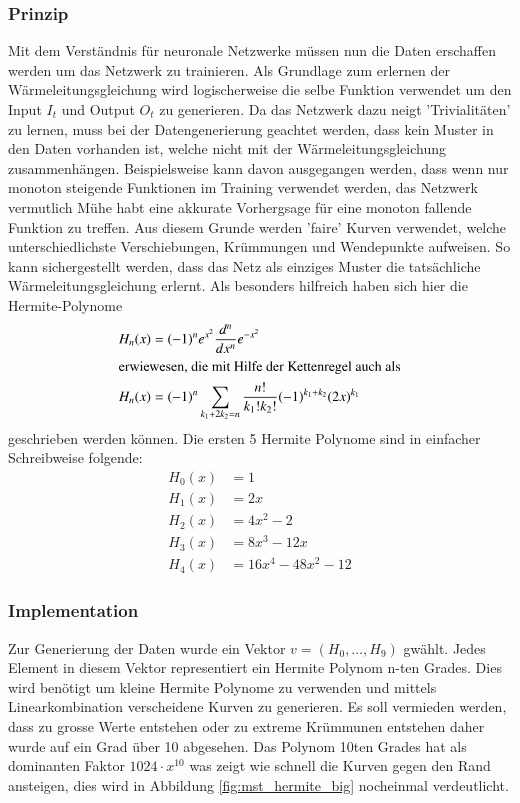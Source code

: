 \subsubsection{Prinzip}
Mit dem Verständnis für neuronale Netzwerke müssen nun die Daten erschaffen werden um das Netzwerk zu trainieren. Als Grundlage zum erlernen der Wärmeleitungsgleichung wird logischerweise die selbe Funktion verwendet um den Input $I_{t}$ und Output $O_{t}$ zu generieren. Da das Netzwerk dazu neigt 'Trivialitäten' zu lernen, muss bei der Datengenerierung geachtet werden, dass kein Muster in den Daten vorhanden ist, welche nicht mit der Wärmeleitungsgleichung zusammenhängen. Beispielsweise kann davon ausgegangen werden, dass wenn nur monoton steigende Funktionen im Training verwendet werden, das Netzwerk vermutlich Mühe habt eine akkurate Vorhergsage für eine monoton fallende Funktion zu treffen. Aus diesem Grunde werden 'faire' Kurven verwendet, welche unterschiedlichste Verschiebungen, Krümmungen und Wendepunkte aufweisen. So kann sichergestellt werden, dass das Netz als einziges Muster die tatsächliche Wärmeleitungsgleichung erlernt. Als besonders hilfreich haben sich hier die Hermite-Polynome
\begin{align}
	H_n(x) &=(-1)^{n}e^{x^{2}}{\frac {d^{n}}{d x^{n}}}e^{-x^{2}}
	\\
	\intertext{erwiewesen, die mit Hilfe der Kettenregel auch als}
	H_n(x) &=(-1)^{n}\sum _{k_{1}+2k_{2}=n}{\frac {n!}{k_{1}!k_{2}!}}(-1)^{k_{1}+k_{2}}(2x)^{k_{1}}
\end{align}
geschrieben werden können.
Die ersten 5 Hermite Polynome sind in einfacher Schreibweise folgende:
\begin{align}
H_{0}(x) &= 1\\
H_{1}(x) &= 2x\\
H_{2}(x) &= 4x^{2}-2\\
H_{3}(x) &= 8x^{3}-12x\\
H_{4}(x) &= 16x^{4}-48x^{2}-12
\end{align}

\subsubsection{Implementation}

Zur Generierung der Daten wurde ein Vektor $v=(H_0, \dots ,H_9)$ gwählt. Jedes Element in diesem Vektor representiert ein Hermite Polynom n-ten Grades. Dies wird benötigt um kleine Hermite Polynome zu verwenden und mittels Linearkombination verscheidene Kurven zu generieren. Es soll vermieden werden, dass zu grosse Werte entstehen oder zu extreme Krümmunen entstehen daher wurde auf ein Grad über 10 abgesehen. Das Polynom 10ten Grades hat als dominanten Faktor $1024 \cdot x^{10}$ was zeigt wie schnell die Kurven gegen den Rand ansteigen, dies wird in Abbildung \ref{fig:mst_hermite_big} nocheinmal verdeutlicht.

